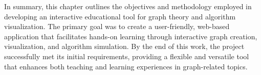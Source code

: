 In summary, this chapter outlines the objectives and methodology employed in developing an interactive educational tool for graph theory and algorithm visualization. The primary goal was to create a user-friendly, web-based application that facilitates hands-on learning through interactive graph creation, visualization, and algorithm simulation. By the end of this work, the project successfully met its initial requirements, providing a flexible and versatile tool that enhances both teaching and learning experiences in graph-related topics.